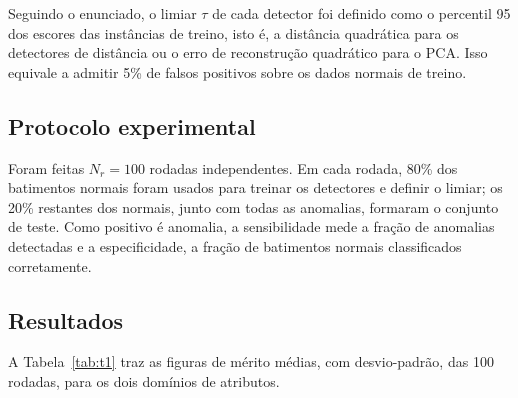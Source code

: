 \documentclass[12pt,a4paper]{scrartcl}
\newcommand{\legend}[1]{\par\vspace{0.3em}{\footnotesize #1}}
\begin{document}
Seguindo o enunciado, o limiar $\tau$ de cada detector foi definido como o percentil 95 dos escores das instâncias de treino, isto é, a distância quadrática para os detectores de distância ou o erro de reconstrução quadrático para o PCA. Isso equivale a admitir 5\% de falsos positivos sobre os dados normais de treino.

\subsection{Protocolo experimental}

Foram feitas $N_r = 100$ rodadas independentes. Em cada rodada, 80\% dos batimentos normais foram usados para treinar os detectores e definir o limiar; os 20\% restantes dos normais, junto com todas as anomalias, formaram o conjunto de teste. Como positivo é anomalia, a sensibilidade mede a fração de anomalias detectadas e a especificidade, a fração de batimentos normais classificados corretamente.

\subsection{Resultados}

A Tabela~\ref{tab:t1} traz as figuras de mérito médias, com desvio-padrão, das 100 rodadas, para os dois domínios de atributos.

\begin{table}[H]
\centering
\caption{Resultados médios (100 rodadas) dos detectores sem redução de dimensionalidade.}
\label{tab:t1}
\footnotesize
{}
\legend{Fonte: elaborada pelo autor.}
\end{table}
\end{document}
